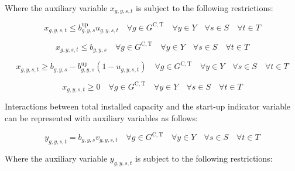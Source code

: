 \documentclass{article}
\newcommand{\sGeneratorsCandidateThermal}{G^{\mathrm{C,T}}}
\newcommand{\sYears}{Y}
\newcommand{\sScenarios}{S}
\newcommand{\sIntervals}{T}
\newcommand{\iGenerator}{g}
\newcommand{\iYear}{y}
\newcommand{\iScenario}{s}
\newcommand{\iInterval}{t}
\newcommand{\vStartupIndicator}[1][\iGenerator,\iYear,\iScenario,\iInterval]{v_{#1}}
\newcommand{\vOnIndicator}[1][\iGenerator,\iYear,\iScenario,\iInterval]{u_{#1}}
\newcommand{\vInstalledCapacityTotalScenario}[1][\iGenerator,\iYear,\iScenario]{b_{#1}}
\newcommand{\vInstalledCapacityOnStateAux}[1][\iGenerator,\iYear,\iScenario,\iInterval]{x_{#1}}
\newcommand{\vInstalledCapacityStartupStateAux}[1][\iGenerator,\iYear,\iScenario,\iInterval]{y_{#1}}
\begin{document}
Where the auxiliary variable $\vInstalledCapacityOnStateAux$ is subject to the following restrictions:

\begin{equation}
\vInstalledCapacityOnStateAux \leq \vInstalledCapacityTotalScenario^{\mathrm{up}} \vOnIndicator \quad \forall \iGenerator \in \sGeneratorsCandidateThermal \quad \forall \iYear \in \sYears \quad \forall \iScenario \in \sScenarios \quad \forall \iInterval \in \sIntervals
\label{eqn: on state aux variable block start}
\end{equation}

\begin{equation}
\vInstalledCapacityOnStateAux \leq \vInstalledCapacityTotalScenario \quad \forall \iGenerator \in \sGeneratorsCandidateThermal \quad \forall \iYear \in \sYears \quad \forall \iScenario \in \sScenarios \quad \forall \iInterval \in \sIntervals
\end{equation}

\begin{equation}
\vInstalledCapacityOnStateAux \geq \vInstalledCapacityTotalScenario - \vInstalledCapacityTotalScenario^{\mathrm{up}} \left(1 - \vOnIndicator \right) \quad \forall \iGenerator \in \sGeneratorsCandidateThermal \quad \forall \iYear \in \sYears \quad \forall \iScenario \in \sScenarios \quad \forall \iInterval \in \sIntervals
\end{equation}

\begin{equation}
\vInstalledCapacityOnStateAux \geq 0 \quad \forall \iGenerator \in \sGeneratorsCandidateThermal \quad \forall \iYear \in \sYears \quad \forall \iScenario \in \sScenarios \quad \forall \iInterval \in \sIntervals
\label{eqn: on state aux variable block end}
\end{equation}

Interactions between total installed capacity and the start-up indicator variable can be represented with auxiliary variables as follows:

\begin{equation}
\vInstalledCapacityStartupStateAux = \vInstalledCapacityTotalScenario \vStartupIndicator \quad \forall \iGenerator \in \sGeneratorsCandidateThermal \quad \forall \iYear \in \sYears \quad \forall \iScenario \in \sScenarios \quad \forall \iInterval \in \sIntervals
\end{equation}

Where the auxiliary variable $\vInstalledCapacityStartupStateAux$ is subject to the following restrictions:
\end{document}
